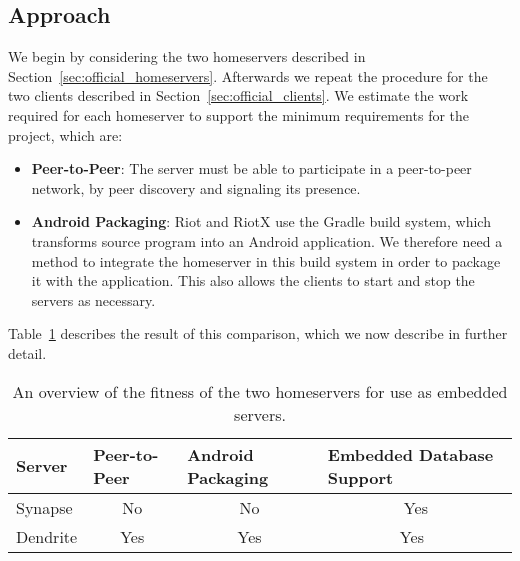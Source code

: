 \subsection{Approach}
We begin by considering the two homeservers described in Section~\ref{sec:official_homeservers}.
Afterwards we repeat the procedure for the two clients described in Section~\ref{sec:official_clients}.
We estimate the work required for each homeserver to support the minimum requirements for the project, which are:
\begin{itemize}
	\item{
	      \textbf{Peer-to-Peer}:
	      The server must be able to participate in a peer-to-peer network, by peer discovery and signaling its presence.
	      }
	\item{
	      \textbf{Android Packaging}:
	      Riot and RiotX use the Gradle\cite{gradle} build system, which transforms source program into an Android application.
	      We therefore need a method to integrate the homeserver in this build system in order to package it with the application.
	      This also allows the clients to start and stop the servers as necessary.
	      }
\end{itemize}

Table~\ref{tab:homeserver_comparison} describes the result of this comparison, which we now describe in further detail.

\begin{table}
	\center{}
	\begin{tabular}{lccc}
		\textbf{Server} & \multicolumn{1}{l}{\textbf{Peer-to-Peer}} & \multicolumn{1}{l}{\textbf{Android Packaging}} & \multicolumn{1}{l}{\textbf{Embedded Database Support}} \\ \toprule
		Synapse         & No                                        & No                                             & Yes                                                    \\
		Dendrite        & Yes                                       & Yes                                            & Yes\footnotemark\
	\end{tabular}
	\caption{An overview of the fitness of the two homeservers for use as embedded servers.}%
	\label{tab:homeserver_comparison}
\end{table}

